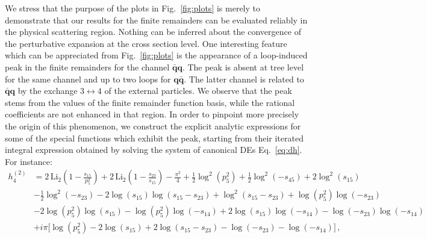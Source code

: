 \documentclass[main.tex]{subfiles}
\begin{document}
We stress that the purpose of the plots in Fig.~\ref{fig:plots} is merely to demonstrate that our results for the finite remainders can be evaluated reliably in the physical scattering region. Nothing can be inferred about the convergence of the perturbative expansion at the cross section level. One interesting feature which can be appreciated from Fig.~\ref{fig:plots} is the appearance of a loop-induced peak in the finite remainders for the channel $\mathbf{\bar{q}q}$. The peak is absent at tree level for the same channel and up to two loops for $\mathbf{q\bar{q}}$. The latter channel is related to $\mathbf{\bar{q}q}$ by the exchange $3\leftrightarrow 4$ of the external particles. We observe that the peak stems from the values of the finite remainder function basis, while the rational coefficients are not enhanced in that region. In order to pinpoint more precisely the origin of this phenomenon, we construct the explicit analytic expressions for some of the special functions which exhibit the peak, starting from their iterated integral expression obtained by solving the system of canonical DEs Eq.~\ref{eq:dh}. For instance:
\begin{align} \label{eq:h24}
h^{(2)}_4 & = 2 \, \text{Li}_2\left( 1 - \frac{s_{15}}{p_5^2} \right) + 2 \, \text{Li}_2 \left( 1- \frac{s_{23}}{s_{15}}\right) -\frac{\pi^2}{4} + \frac{1}{2} \log^2\left( p_5^2 \right) + \frac{1}{2}\log^2\left( -s_{45}\right) + 2 \log^2\left( s_{15}\right) \nonumber \\
& - \frac{1}{2}\log^2\left( -s_{23}\right) - 2 \log\left( s_{15}\right) \log\left( s_{15} - s_{23}\right) + \log^2\left( s_{15} - s_{23}\right) + \log\left( p_5^2\right) \log\left(-s_{23}\right) \nonumber \\
& - 2 \log\left( p_5^2\right) \log\left(s_{15} \right)  - \log\left( p_5^2\right) \log\left( -s_{14}\right) +2 \log\left( s_{15}\right) \log\left( -s_{14}\right) 
 - \log\left(-s_{23}\right) \log\left( -s_{14}\right) \nonumber \\
 & +i \pi \biggl[ \log\left( p_5^2\right) - 2 \log\left( s_{15}\right) + 2 \log\left( s_{15} - s_{23}\right) - \log\left( -s_{23}\right) - \log\left( -s_{14}\right)\biggr] \,,
\end{align}
\end{document}
